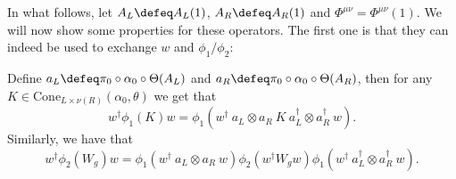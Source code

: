 In what follows, let $A_L\defeq A_L(1)$, $A_R\defeq A_R(1)$ and $\Phi^{\mu\nu}=\Phi^{\mu\nu}(1)$. We will now show some properties for these operators. The first one is that they can indeed be used to exchange $w$ and $\phi_1/\phi_2$:
\begin{lemma}\label{lem:TranslationOutOfPhi_KW}
	Define $a_L\defeq \pi_0\circ\alpha_0\circ\Theta(A_L)$ and $a_R\defeq \pi_0\circ\alpha_0\circ\Theta(A_R)$, then for any $K\in\text{Cone}_{L\times\nu(R)}(\alpha_0,\theta)$ we get that
	\begin{equation}\label{eq:TranslationOutOfPhi_K}
		w^\dagger \phi_1(K)w=\phi_1(w^\dagger \: a_L\otimes a_R \: K \: a_L^\dagger\otimes a_R^\dagger \: w).
	\end{equation}
	Similarly, we have that
	\begin{equation}\label{eq:TranslationOutOfPhi_W}
		w^\dagger \phi_2(W_g)w=\phi_1(w^\dagger \: a_L\otimes a_R \: w)\phi_2(w^\dagger W_g w)\phi_1(w^\dagger \: a_L^\dagger\otimes a_R^\dagger \: w).
	\end{equation}
\end{lemma}
